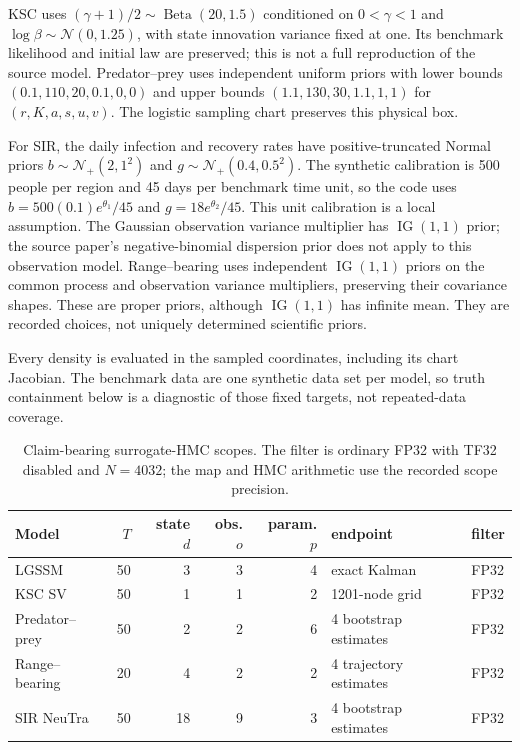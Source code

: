 KSC uses $(\gamma+1)/2\sim\operatorname{Beta}(20,1.5)$ conditioned on
$0<\gamma<1$ and $\log\beta\sim\mathcal N(0,1.25)$, with state innovation
variance fixed at one.  Its benchmark likelihood and initial law are preserved;
this is not a full reproduction of the source model.  Predator--prey uses
independent uniform priors with lower bounds $(0.1,110,20,0.1,0,0)$ and upper
bounds $(1.1,130,30,1.1,1,1)$ for $(r,K,a,s,u,v)$.  The logistic sampling chart
preserves this physical box.

For SIR, the daily infection and recovery rates have positive-truncated Normal
priors $b\sim\mathcal N_+(2,1^2)$ and
$g\sim\mathcal N_+(0.4,0.5^2)$.  The synthetic calibration is 500 people per
region and 45 days per benchmark time unit, so the code uses
$b=500(0.1)e^{\theta_1}/45$ and $g=18e^{\theta_2}/45$.
This unit calibration is a local assumption.  The Gaussian observation
variance multiplier has $\operatorname{IG}(1,1)$ prior; the source paper's
negative-binomial dispersion prior does not apply to this observation model.
Range--bearing uses independent $\operatorname{IG}(1,1)$ priors on the common
process and observation variance multipliers, preserving their covariance
shapes.  These are proper priors, although $\operatorname{IG}(1,1)$ has infinite
mean.  They are recorded choices, not uniquely determined scientific priors.

Every density is evaluated in the sampled coordinates, including its chart
Jacobian.  The benchmark data are one synthetic data set per model, so truth
containment below is a diagnostic of those fixed targets, not repeated-data
coverage.

\begin{table}[ht]
\centering\small
\caption{Claim-bearing surrogate-HMC scopes.  The filter is ordinary FP32 with
TF32 disabled and $N=4032$; the map and HMC arithmetic use the recorded
scope precision.}
\label{tab:bf-surrogate-scopes}
\begin{tabular}{lrrrrll}
\toprule
Model & $T$ & state $d$ & obs. $o$ & param. $p$ & endpoint & filter\\
\midrule
LGSSM & 50 & 3 & 3 & 4 & exact Kalman & FP32\\
KSC SV & 50 & 1 & 1 & 2 & 1201-node grid & FP32\\
Predator--prey & 50 & 2 & 2 & 6 & 4 bootstrap estimates & FP32\\
Range--bearing & 20 & 4 & 2 & 2 & 4 trajectory estimates & FP32\\
SIR NeuTra & 50 & 18 & 9 & 3 & 4 bootstrap estimates & FP32\\
\bottomrule
\end{tabular}
\end{table}

